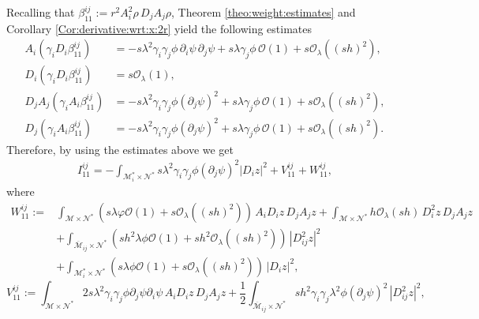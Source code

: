\documentclass[11pt,oneside,leqno]{amsart}
\numberwithin{equation}{section}
\numberwithin{equation}{section}
\begin{document}
Recalling that $\beta_{11}^{ij}:=r^{2}A_{i}^{2}\rho\,D_{j}A_{j}\rho$, Theorem \ref{theo:weight:estimates} and Corollary \ref{Cor:derivative:wrt:x:2r} yield the following estimates
\begin{equation}
    \begin{split}
A_{i}(\gamma_{i}D_{i}\beta_{11}^{ij})&=-s\lambda^{2}\gamma_{i}\gamma_{j}\phi\,\partial_{i}\psi\,\partial_{j}\psi+s\lambda\gamma_{j}\phi\,\mathcal{O}(1)+s\mathcal{O}_{\lambda}((sh)^{2}),\\
        D_{i}(\gamma_{i}D_{i}\beta_{11}^{ij})&=s\mathcal{O}_{\lambda}(1),\\
        D_{j}A_{j}(\gamma_{i}A_{i}\beta_{11}^{ij})&=-s\lambda^{2}\gamma_{i}\gamma_{j}\phi(\partial_{j}\psi)^{2}+s\lambda\gamma_{j}\phi\,\mathcal{O}(1)+s\mathcal{O}_{\lambda}((sh)^{2}),\\
        D_{j}(\gamma_{i}A_{i}\beta_{11}^{ij})&=-s\lambda^{2}\gamma_{i}\gamma_{j}\phi(\partial_{j}\psi)^{2}+s\lambda\gamma_{j}\phi\,\mathcal{O}(1)+s\mathcal{O}_{\lambda}((sh)^{2}).
    \end{split}
\end{equation}
Therefore, by using the estimates above we get
\begin{equation}
    \begin{split}
        I_{11}^{ij}=-\int_{\mathcal{M}_{i}^{\ast}\times\mathcal{N}^{\ast}}s\lambda^{2}\gamma_{i}\gamma_{j}\phi(\partial_{j}\psi)^{2}|D_{i}z|^{2}+V_{11}^{ij}+W_{11}^{ij},
    \end{split}
\end{equation}
where
\begin{equation}
\begin{split}
    W_{11}^{ij}:=&\int_{\mathcal{M}\times\mathcal{N}^{\ast}}\left(s\lambda\varphi\mathcal{O}(1)+s\mathcal{O}_{\lambda}((sh)^{2})\right)\,A_{i}D_{i}z\,D_{j}A_{j}z+\int_{\mathcal{M}\times\mathcal{N}^{\ast}}h\mathcal{O}_{\lambda}(sh)\,D_{i}^{2}z\,D_{j}A_{j}z\\
    &+\int_{\overline{\mathcal{M}}_{ij}\times\mathcal{N}^{\ast}}\left(sh^{2}\lambda\phi\mathcal{O}(1)+sh^{2}\mathcal{O}_{\lambda}((sh)^{2})\right)\,|D_{ij}^{2}z|^{2}\\
    &+\int_{\mathcal{M}_{i}^{\ast}\times\mathcal{N}^{\ast}}(s\lambda\phi\mathcal{O}(1)+s\mathcal{O}_{\lambda}((sh)^{2}))\, |D_{i}z|^{2},
    \end{split}
\end{equation}
\begin{equation}
    V_{11}^{ij}:=\int_{\mathcal{M}\times\mathcal{N}^{\ast}}2s\lambda^{2}\gamma_{i}\gamma_{j}\phi\partial_{j}\psi\partial_{i}\psi\,A_{i}D_{i}z\,D_{j}A_{j}z+\frac{1}{2}\int_{\overline{\mathcal{M}}_{ij}\times\mathcal{N}^{\ast}} sh^{2}\gamma_{i}\gamma_{j}\lambda^{2}\phi(\partial_{j}\psi)^{2}\,|D_{ij}^{2}z|^{2},
\end{equation}
\end{document}
